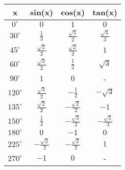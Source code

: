\documentclass[10pt,twocolumn,a4paper]{article}
\begin{document}
\begin{flushleft}
\begin{tabular}{|c|c|c|c|}
\hline
\rule[-1ex]{0pt}{2.5ex} x & sin(x) & cos(x) & tan(x) \\
\hline
\rule[-1ex]{0pt}{2.5ex} $0^\circ$ & $0$ & $1$ & $0$ \\
\hline
\rule[-1ex]{0pt}{2.5ex} $30^\circ$ & $\frac{1}{2}$ & $\frac{\sqrt{3}}{2}$ & $\frac{\sqrt{3}}{3}$ \\
\hline
\rule[-1ex]{0pt}{2.5ex} $45^\circ$ & $\frac{\sqrt{2}}{2}$ & $\frac{\sqrt{2}}{2}$ & $1$ \\
\hline
\rule[-1ex]{0pt}{2.5ex} $60^\circ$ & $\frac{\sqrt{3}}{2}$ & $\frac{1}{2}$ & $\sqrt{3}$ \\
\hline
\rule[-1ex]{0pt}{2.5ex} $90^\circ$ & $1$ & $0$ & - \\
\hline
\rule[-1ex]{0pt}{2.5ex} $120^\circ$ & $\frac{\sqrt{3}}{2}$ & $-\frac{1}{2}$ & $-\sqrt{3}$ \\
\hline
\rule[-1ex]{0pt}{2.5ex} $135^\circ$ & $\frac{\sqrt{2}}{2}$ & $-\frac{\sqrt{2}}{2}$ & $-1$ \\
\hline
\rule[-1ex]{0pt}{2.5ex} $150^\circ$ & $\frac{1}{2}$ & $-\frac{\sqrt{3}}{2}$ & $-\frac{\sqrt{3}}{3}$ \\
\hline
\rule[-1ex]{0pt}{2.5ex} $180^\circ$ & $0$ & $-1$ & $0$ \\
\hline
\rule[-1ex]{0pt}{2.5ex} $225^\circ$ & $-\frac{\sqrt{2}}{2}$ & $-\frac{\sqrt{2}}{2}$ & $1$ \\
\hline
\rule[-1ex]{0pt}{2.5ex} $270^\circ$ & $-1$ & $0$ & - \\
\hline
\end{tabular}


\end{flushleft}
\end{document}
